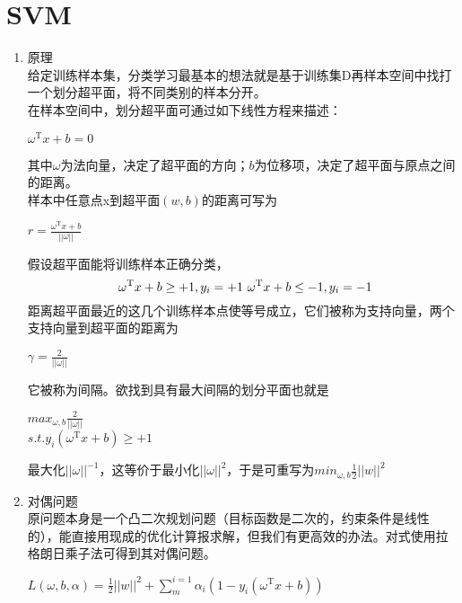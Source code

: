 \chapter{SVM}
\linespread{1.3} 
\setlength{\parindent}{2em}
\setlength{\parskip}{6pt}
\begin{enumerate}
	\item 原理\\
	给定训练样本集，分类学习最基本的想法就是基于训练集D再样本空间中找打一个划分超平面，将不同类别的样本分开。\\
	在样本空间中，划分超平面可通过如下线性方程来描述：
	\begin{center}
		$\omega^\mathrm{T}x+b=0$\\
	\end{center}
	其中$\omega$为法向量，决定了超平面的方向；$b$为位移项，决定了超平面与原点之间的距离。\\
	样本中任意点x到超平面$(w,b)$的距离可写为\\
	\begin{center}
		\begin{large}
			$r=\frac{\omega^\mathrm{T}x+b}{||\omega||}$
		\end{large}
	\end{center}
	假设超平面能将训练样本正确分类，
	\[
	\ \omega^\mathrm{T}x+b \geq +1, y_i=+1 \\
	\ \omega^\mathrm{T}x+b \leq -1, y_i=-1
	\]
	距离超平面最近的这几个训练样本点使等号成立，它们被称为支持向量，两个支持向量到超平面的距离为\\
	\begin{center}
		$\gamma = \frac{2}{||\omega||}$
	\end{center}
	它被称为间隔。欲找到具有最大间隔的划分平面也就是\\
	\begin{center}
		$max_{\omega ,b} \frac{2}{||\omega||}$ \\
		$s.t. y_i(\omega^\mathrm{T}x+b)\geq +1$
	\end{center}
	最大化$||\omega||^{-1}$，这等价于最小化$||\omega||^{2}$，于是可重写为$min_{\omega ,b} \frac{1}{2} ||w||^{2}$
	\item 对偶问题\\
	原问题本身是一个凸二次规划问题（目标函数是二次的，约束条件是线性的），能直接用现成的优化计算报求解，但我们有更高效的办法。对式使用拉格朗日乘子法可得到其对偶问题。
	\begin{center}
		$L(\omega,b,\alpha) = \frac{1}{2}||w||^2+\sum_{m}^{i=1}\alpha_{i}(1-y_i(\omega^\mathrm{T}x+b))$
	\end{center}

\end{enumerate}
